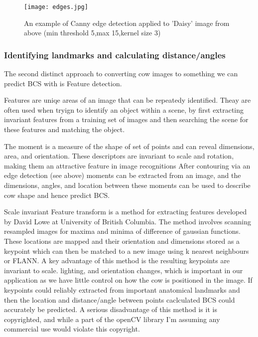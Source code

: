 \documentclass[11pt]{article}
\begin{document}

	\begin{figure}[h!]
		\centering
		\texttt{[image: edges.jpg]}
		\caption{An example of Canny edge detection applied to 'Daisy' image from above (min threshold 5,max 15,kernel size 3) }
		\label{fig:<+label+>}
	\end{figure}
\newpage


	\subsubsection{Identifying landmarks and calculating distance/angles}

	The second distinct approach to converting cow images to something we can predict BCS with is Feature detection.


	Features are uniqe areas of an image that can be repeatedy identified.
	Theay are often used when tryign to identify an object within a scene, by first extracting invariant features from a training set of images and then searching the scene for these features and matching the object.


	The moment is a measure of the shape of set of points and can reveal dimensions, area, and orientation. 
	These descriptors are invariant to scale and rotation, making them an attractive feature in image recognitions
	After contouring via an edge detection (see above) moments can be extracted from an image, and the dimensions, angles, and location between these moments can be used to describe cow shape and hence predict BCS.


	
	Scale invariant Feature transform is a method for extracting features developed by David Lowe at University of British Columbia\cite{Lowe2004a}.
	The method involves scanning resampled images for maxima and minima of difference of gaussian functions.
	These locations are mapped and their orientation and dimensions stored as a keypoint which can then be matched to a new image using k nearest neighbours or FLANN. 
	A key advantage of this method is the resulting keypoints are invariant to scale. lighting, and orientation changes, which is important in our application as we have little control on how the cow is positioned in the image.
	If keypoints could reliably extracted from important anatomical landmarks and then the location and distance/angle between points caclculated BCS could accurately be predicted.
	A serious disadvantage of this method is it is copyrighted, and while a part of the openCV library I'm assuming any commercial use would violate this copyright.
\end{document}

